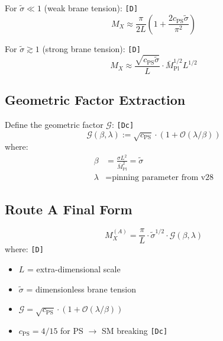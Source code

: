 \documentclass[11pt,a4paper]{article}
\newcommand{\tagD}{\textcolor{green!50!black}{\texttt{[D]}}}
\newcommand{\tagDc}{\textcolor{blue!70!black}{\texttt{[Dc]}}}
\theoremstyle{definition}
\begin{document}
For $\tilde{\sigma} \ll 1$ (weak brane tension): \tagD{}
\begin{equation}
\label{eq:mx-weak-tension}
M_X \approx \frac{\pi}{2L} \left(1 + \frac{2 c_{\text{PS}} \tilde{\sigma}}{\pi^2}\right)
\end{equation}

For $\tilde{\sigma} \gtrsim 1$ (strong brane tension): \tagD{}
\begin{equation}
\label{eq:mx-strong-tension}
M_X \approx \frac{\sqrt{c_{\text{PS}} \tilde{\sigma}}}{L} \cdot \bar{M}_{\text{Pl}}^{1/2} L^{1/2}
\end{equation}

\subsection{Geometric Factor Extraction}
\label{subsec:geometric-factor}

Define the geometric factor $\mathcal{G}$: \tagDc{}
\begin{equation}
\label{eq:geometric-factor-def}
\mathcal{G}(\beta, \lambda) := \sqrt{c_{\text{PS}}} \cdot \left(1 + \mathcal{O}(\lambda/\beta)\right)
\end{equation}
where:
\begin{align}
\label{eq:beta-def}
\beta &= \frac{\sigma L^2}{\bar{M}_{\text{Pl}}^2} = \tilde{\sigma} \\
\label{eq:lambda-def}
\lambda &= \text{pinning parameter from v28}
\end{align}

\subsection{Route A Final Form}
\label{subsec:route-a-final}

\begin{derivbox}
\begin{equation}
\label{eq:mx-route-a-boxed}
\boxed{M_X^{(A)} = \frac{\pi}{L} \cdot \tilde{\sigma}^{1/2} \cdot \mathcal{G}(\beta, \lambda)}
\end{equation}
where: \tagD{}
\begin{itemize}
  \item $L$ = extra-dimensional scale
  \item $\tilde{\sigma}$ = dimensionless brane tension
  \item $\mathcal{G} = \sqrt{c_{\text{PS}}} \cdot (1 + \mathcal{O}(\lambda/\beta))$
  \item $c_{\text{PS}} = 4/15$ for PS $\to$ SM breaking \tagDc{}
\end{itemize}
\end{derivbox}
\end{document}
